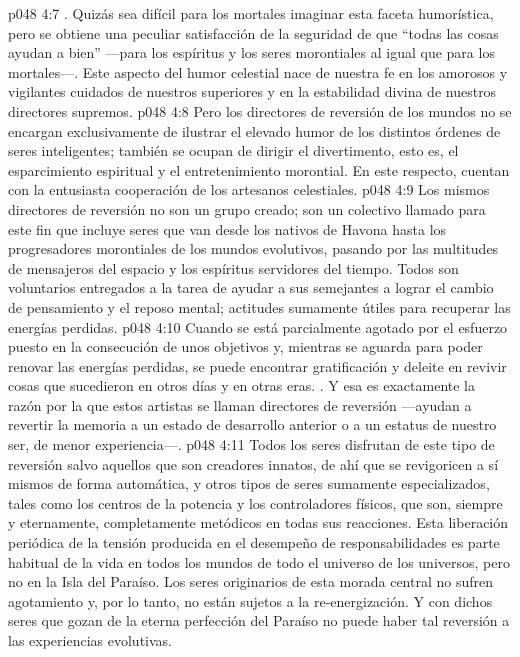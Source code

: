 \vs p048 4:7 . Quizás sea difícil para los mortales imaginar esta faceta humorística, pero se obtiene una peculiar satisfacción de la seguridad de que “todas las cosas ayudan a bien” ---para los espíritus y los seres morontiales al igual que para los mortales---. Este aspecto del humor celestial nace de nuestra fe en los amorosos y vigilantes cuidados de nuestros superiores y en la estabilidad divina de nuestros directores supremos.
\vs p048 4:8 \pc Pero los directores de reversión de los mundos no se encargan exclusivamente de ilustrar el elevado humor de los distintos órdenes de seres inteligentes; también se ocupan de dirigir el divertimento, esto es, el esparcimiento espiritual y el entretenimiento morontial. En este respecto, cuentan con la entusiasta cooperación de los artesanos celestiales.
\vs p048 4:9 Los mismos directores de reversión no son un grupo creado; son un colectivo llamado para este fin que incluye seres que van desde los nativos de Havona hasta los progresadores morontiales de los mundos evolutivos, pasando por las multitudes de mensajeros del espacio y los espíritus servidores del tiempo. Todos son voluntarios entregados a la tarea de ayudar a sus semejantes a lograr el cambio de pensamiento y el reposo mental; actitudes sumamente útiles para recuperar las energías perdidas.
\vs p048 4:10 \pc Cuando se está parcialmente agotado por el esfuerzo puesto en la consecución de unos objetivos y, mientras se aguarda para poder renovar las energías perdidas, se puede encontrar gratificación y deleite en revivir cosas que sucedieron en otros días y en otras eras. . Y esa es exactamente la razón por la que estos artistas se llaman directores de reversión ---ayudan a revertir la memoria a un estado de desarrollo anterior o a un estatus de nuestro ser, de menor experiencia---.
\vs p048 4:11 Todos los seres disfrutan de este tipo de reversión salvo aquellos que son creadores innatos, de ahí que se revigoricen a sí mismos de forma automática, y otros tipos de seres sumamente especializados, tales como los centros de la potencia y los controladores físicos, que son, siempre y eternamente, completamente metódicos en todas sus reacciones. Esta liberación periódica de la tensión producida en el desempeño de responsabilidades es parte habitual de la vida en todos los mundos de todo el universo de los universos, pero no en la Isla del Paraíso. Los seres originarios de esta morada central no sufren agotamiento y, por lo tanto, no están sujetos a la re\hyp{}energización. Y con dichos seres que gozan de la eterna perfección del Paraíso no puede haber tal reversión a las experiencias evolutivas.
